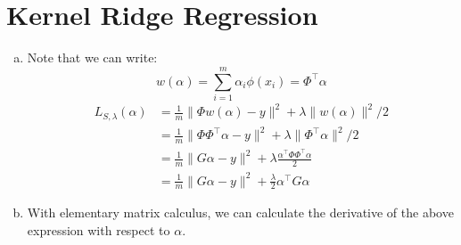 \documentclass{amsart}
\theoremstyle{definition}
\begin{document}
\section{Kernel Ridge Regression}
\begin{enumerate}[(a)]
  \item 
    Note that we can write:
    \[
      w(\alpha) = \displaystyle\sum_{i = 1}^{m }\alpha_i \phi(x_i) = \Phi^\intercal \alpha
    \]
    \begin{align*}
      L_{S, \lambda}(\alpha) &= \displaystyle\frac{1}{m } \| \Phi w(\alpha) - y\|^2 + \lambda \|w(\alpha)\|^2/2\\
                             &= \frac1{m} \| \Phi \Phi^\intercal \alpha - y\|^2 + \lambda \|\Phi^\intercal \alpha\|^2/2 \\
                             &= \frac1{m} \| G\alpha - y\|^2 + \lambda \frac{\alpha^\intercal \Phi \Phi^\intercal \alpha}{2}\\
                             &= \frac1{m} \|G\alpha - y\|^2 + \displaystyle\frac{\lambda }{2}\alpha^\intercal G \alpha 
    \end{align*}
    \item 
    With elementary matrix calculus, we can calculate the derivative of the above expression with respect to $\alpha$.
    

\end{enumerate}
\end{document}

